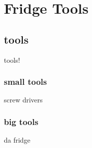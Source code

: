 \chapter{Fridge Tools}
\label{fridge-tools} 
\section{tools}
tools!
\subsection{small tools}
screw drivers
\subsection{big tools}
da fridge